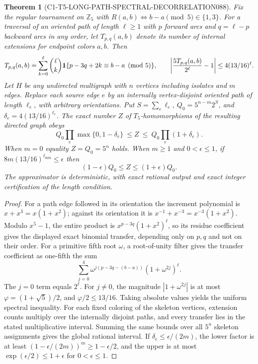 \documentclass[11pt]{article}
\newtheorem{theorem}{Theorem}
\begin{document}
\begin{theorem}[C1-T5-LONG-PATH-SPECTRAL-DECORRELATION088]
Fix the regular tournament on $\mathbb{Z}_5$ with
$R(a,b)\iff b-a\pmod 5\in\{1,3\}$.  For a traversal of an
oriented path of length $\ell\ge1$ with $p$ forward arcs and
$q=\ell-p$ backward arcs in any order, let $T_{p,q}(a,b)$
denote its number of internal extensions for endpoint colors $a,b$.
Then
\[
T_{p,q}(a,b)=\sum_{k=0}^{\ell}\binom{\ell}{k}
 {\bf1}\{p-3q+2k\equiv b-a\pmod5\},
\qquad
\left|\frac{5T_{p,q}(a,b)}{2^\ell}-1\right|
 \le4(13/16)^\ell.
\]
Let $H$ be any undirected multigraph with $n$ vertices including
isolates and $m$ edges. Replace each source edge $e$ by an internally
vertex-disjoint oriented path of length $\ell_e$, with arbitrary
orientations. Put $S=\sum_e\ell_e$,
$Q_0=5^{n-m}2^S$, and
$\delta_e=4(13/16)^{\ell_e}$. The exact number $Z$ of
$T_5$-homomorphisms of the resulting directed graph obeys
\[
Q_0\prod_e\max\{0,1-\delta_e\}\ \le Z\ \le\
Q_0\prod_e(1+\delta_e).
\]
When $m=0$ equality $Z=Q_0=5^n$ holds.
When $m\ge1$ and $0<\epsilon\le1$,
if $8m(13/16)^{\ell_{\min}}\le\epsilon$ then
\[
(1-\epsilon)Q_0\le Z\le(1+\epsilon)Q_0.
\]
The approximator is deterministic, with exact rational output and
exact integer certification of the length condition.
\end{theorem}
\begin{proof}
For a path edge followed in its orientation the increment
polynomial is $x+x^3=x(1+x^2)$; against its orientation it is
$x^{-1}+x^{-3}=x^{-3}(1+x^2)$.
Modulo $x^5-1$, the entire product is
$x^{p-3q}(1+x^2)^\ell$, so its residue coefficient gives
the displayed exact binomial transfer, depending only on $p,q$
and not on their order.
For a primitive fifth root $\omega$, a root-of-unity filter gives
the transfer coefficient as one-fifth the sum
\[
\sum_{j=0}^4\omega^{j(p-3q-(b-a))}
 (1+\omega^{2j})^\ell.
\]
The $j=0$ term equals $2^\ell$.
For $j\ne0$, the magnitude $|1+\omega^{2j}|$ is at most
$\varphi=(1+\sqrt5)/2$, and $\varphi/2\le13/16$.
Taking absolute values yields the uniform spectral inequality.
For each fixed coloring of the skeleton vertices, extension counts
multiply over the internally disjoint paths, and every transfer lies
in the stated multiplicative interval. Summing the same bounds over
all $5^n$ skeleton assignments gives the global rational interval.
If $\delta_e\le\epsilon/(2m)$, the lower factor is at least
$(1-\epsilon/(2m))^m\ge1-\epsilon/2$, and the upper is at most
$\exp(\epsilon/2)\le1+\epsilon$ for $0<\epsilon\le1$.
\end{proof}
\end{document}
